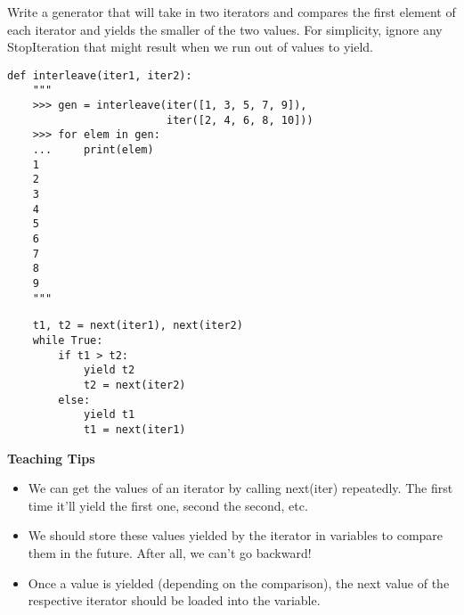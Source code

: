 \begin{blocksection}
\question Write a generator that will take in two iterators and compares the
first element of each iterator and yields the smaller of the two values.
For simplicity, ignore any StopIteration that might result when we run out of
values to yield.

\begin{lstlisting}
def interleave(iter1, iter2):
    """
    >>> gen = interleave(iter([1, 3, 5, 7, 9]),
                         iter([2, 4, 6, 8, 10]))
    >>> for elem in gen:
    ...     print(elem)
    1
    2
    3
    4
    5
    6
    7
    8
    9
    """
\end{lstlisting}

\begin{solution}[1in]
\begin{lstlisting}
    t1, t2 = next(iter1), next(iter2)
    while True:
        if t1 > t2:
            yield t2
            t2 = next(iter2)
        else:
            yield t1
            t1 = next(iter1)
\end{lstlisting}
\end{solution}
\end{blocksection}

\begin{guide}
\begin{blocksection}
    \textbf{Teaching Tips}
    \begin{itemize}
    \item We can get the values of an iterator by calling next(iter) repeatedly. The first time it'll yield the first one, second the second, etc.
    \item We should store these values yielded by the iterator in variables to compare them in the future. After all, we can't go backward!
    \item Once a value is yielded (depending on the comparison), the next value of the respective iterator should be loaded into the variable.
    \end{itemize}
\end{blocksection}
\end{guide}